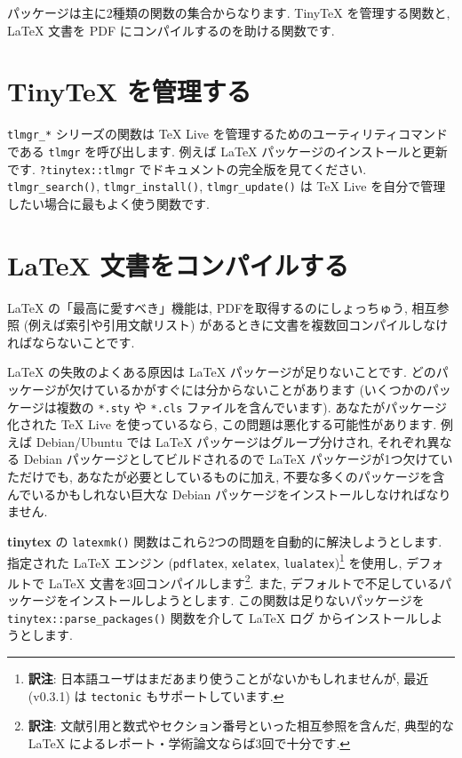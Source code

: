 \documentclass[
  xelatex,ja=standard,jafont=noto]{bxjsreport}
\begin{document}
パッケージは主に2種類の関数の集合からなります. TinyTeX を管理する関数と,
LaTeX 文書を PDF にコンパイルするのを助ける関数です.

\hypertarget{tinytex-ux3092ux7ba1ux7406ux3059ux308b}{%
\section{TinyTeX
を管理する}\label{tinytex-ux3092ux7ba1ux7406ux3059ux308b}}

\texttt{tlmgr\_*} シリーズの関数は TeX Live
を管理するためのユーティリティコマンドである \texttt{tlmgr}
を呼び出します. 例えば LaTeX パッケージのインストールと更新です.
\texttt{?tinytex::tlmgr} でドキュメントの完全版を見てください.
\texttt{tlmgr\_search()}, \texttt{tlmgr\_install()},
\texttt{tlmgr\_update()} は TeX Live
を自分で管理したい場合に最もよく使う関数です.

\hypertarget{latex-ux6587ux66f8ux3092ux30b3ux30f3ux30d1ux30a4ux30ebux3059ux308b}{%
\section{LaTeX
文書をコンパイルする}\label{latex-ux6587ux66f8ux3092ux30b3ux30f3ux30d1ux30a4ux30ebux3059ux308b}}

LaTeX の「最高に愛すべき」機能は, PDFを取得するのにしょっちゅう,
相互参照 (例えば索引や引用文献リスト)
があるときに文書を複数回コンパイルしなければならないことです.

LaTeX の失敗のよくある原因は LaTeX パッケージが足りないことです.
どのパッケージが欠けているかがすぐには分からないことがあります
(いくつかのパッケージは複数の \texttt{*.sty} や \texttt{*.cls}
ファイルを含んでいます). あなたがパッケージ化された TeX Live
を使っているなら, この問題は悪化する可能性があります. 例えば
Debian/Ubuntu では LaTeX パッケージはグループ分けされ, それぞれ異なる
Debian パッケージとしてビルドされるので LaTeX
パッケージが1つ欠けていただけでも, あなたが必要としているものに加え,
不要な多くのパッケージを含んでいるかもしれない巨大な Debian
パッケージをインストールしなければなりません.

\textbf{tinytex} の \texttt{latexmk()}
関数はこれら2つの問題を自動的に解決しようとします. 指定された LaTeX
エンジン (\texttt{pdflatex}, \texttt{xelatex},
\texttt{lualatex})\footnote{\textbf{訳注}:
  日本語ユーザはまだあまり使うことがないかもしれませんが, 最近 (v0.3.1)
  は \texttt{tectonic} もサポートしています.} を使用し, デフォルトで
LaTeX 文書を3回コンパイルします\footnote{\textbf{訳注}:
  文献引用と数式やセクション番号といった相互参照を含んだ, 典型的な LaTeX
  によるレポート・学術論文ならば3回で十分です.}. また,
デフォルトで不足しているパッケージをインストールしようとします.
この関数は足りないパッケージを \texttt{tinytex::parse\_packages()}
関数を介して LaTeX ログ からインストールしようとします.
\end{document}

